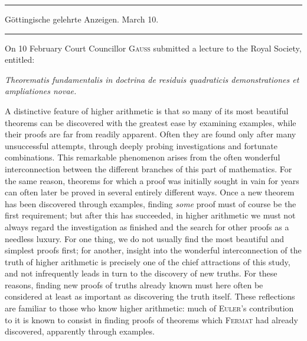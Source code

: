 \clearpage
{}%
\begin{center}
\rule{.82\linewidth}{.35pt}\par
Göttingische gelehrte Anzeigen. March 10.\par
\rule{.82\linewidth}{.35pt}
\end{center}
On 10 February Court Councillor \textsc{Gauss} submitted a lecture to the Royal Society, entitled:
\begin{center}\itshape
Theorematis fundamentalis in doctrina de residuis quadraticis demonstrationes et ampliationes novae.
\end{center}

A distinctive feature of higher arithmetic is that so many of its most beautiful theorems can be discovered with the greatest ease by examining examples, while their proofs are far from readily apparent. Often they are found only after many unsuccessful attempts, through deeply probing investigations and fortunate combinations. This remarkable phenomenon arises from the often wonderful interconnection between the different branches of this part of mathematics. For the same reason, theorems for which a proof was initially sought in vain for years can often later be proved in several entirely different ways. Once a new theorem has been discovered through examples, finding \emph{some} proof must of course be the first requirement; but after this has succeeded, in higher arithmetic we must not always regard the investigation as finished and the search for other proofs as a needless luxury. For one thing, we do not usually find the most beautiful and simplest
%
proofs first; for another, insight into the wonderful interconnection of the truth of higher arithmetic is precisely one of the chief attractions of this study, and not infrequently leads in turn to the discovery of new truths. For these reasons, finding new proofs of truths already known must here often be considered at least as important as discovering the truth itself. These reflections are familiar to those who know higher arithmetic: much of \textsc{Euler}'s contribution to it is known to consist in finding proofs of theorems which \textsc{Fermat} had already discovered, apparently through examples.


